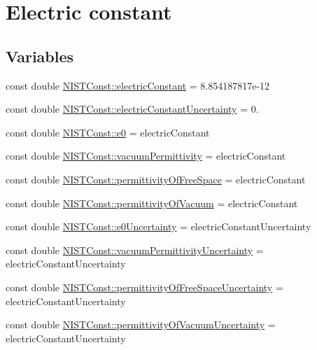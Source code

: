 \hypertarget{group___electric_constant}{}\section{Electric constant}
\label{group___electric_constant}
\subsection*{Variables}
\begin{DoxyCompactItemize}
\item 
const double \hyperlink{group___electric_constant_gae5a425228125285727dd53333725ef76}{N\+I\+S\+T\+Const\+::electric\+Constant} = 8.\+854187817e-\/12
\item 
const double \hyperlink{group___electric_constant_gaf65e89a9fe674a6f80f5a66bbe101aab}{N\+I\+S\+T\+Const\+::electric\+Constant\+Uncertainty} = 0.
\item 
const double \hyperlink{group___electric_constant_ga6fa2aaf171b8dafe96bbd87c7aa95f59}{N\+I\+S\+T\+Const\+::e0} = electric\+Constant
\item 
const double \hyperlink{group___electric_constant_ga46294f940b4149602e7bef336431c7dd}{N\+I\+S\+T\+Const\+::vacuum\+Permittivity} = electric\+Constant
\item 
const double \hyperlink{group___electric_constant_ga56d0b5b81201a3a81b724d45a4a73b81}{N\+I\+S\+T\+Const\+::permittivity\+Of\+Free\+Space} = electric\+Constant
\item 
const double \hyperlink{group___electric_constant_ga81378e87b977f5b3403002e187d3d22c}{N\+I\+S\+T\+Const\+::permittivity\+Of\+Vacuum} = electric\+Constant
\item 
const double \hyperlink{group___electric_constant_ga35084e49b0f999bcafda4ae95038913c}{N\+I\+S\+T\+Const\+::e0\+Uncertainty} = electric\+Constant\+Uncertainty
\item 
const double \hyperlink{group___electric_constant_gac4df73e5c5ea0e0829f575ff1c2cc793}{N\+I\+S\+T\+Const\+::vacuum\+Permittivity\+Uncertainty} = electric\+Constant\+Uncertainty
\item 
const double \hyperlink{group___electric_constant_gad3837c8ac9496d07b2a4c9da66b19e4a}{N\+I\+S\+T\+Const\+::permittivity\+Of\+Free\+Space\+Uncertainty} = electric\+Constant\+Uncertainty
\item 
const double \hyperlink{group___electric_constant_ga4f15fd528291e6284d5fc3ad58c5a97a}{N\+I\+S\+T\+Const\+::permittivity\+Of\+Vacuum\+Uncertainty} = electric\+Constant\+Uncertainty
\end{DoxyCompactItemize}


